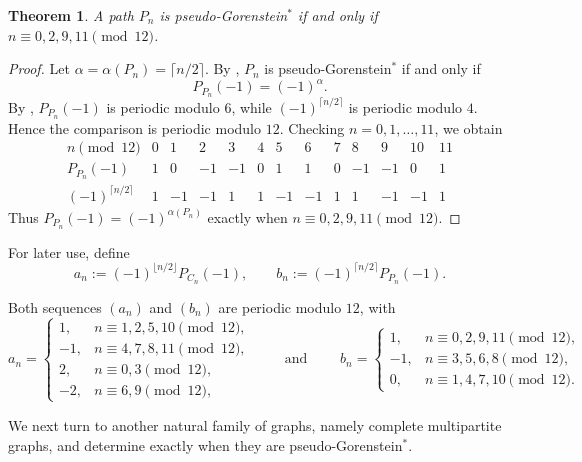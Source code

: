 \documentclass[12pt]{amsart}
\theoremstyle{plain}
\newtheorem{thm}{Theorem}[section]
\theoremstyle{definition}
\begin{document}
\begin{thm}\label{thm:path}
A path \(P_n\) is pseudo-Gorenstein$^{*}$ if and only if \(n\equiv 0,2,9,11 \pmod{12}\).
\end{thm}

\begin{proof}
Let \(\alpha=\alpha(P_n)=\lceil n/2\rceil\). By ,
\(P_n\) is pseudo-Gorenstein$^{*}$ if and only if
\[
P_{P_n}(-1)=(-1)^{\alpha}.
\]
By , \(P_{P_n}(-1)\) is periodic modulo \(6\), while
\((-1)^{\lceil n/2\rceil}\) is periodic modulo \(4\). Hence the comparison is
periodic modulo \(12\). Checking \(n=0,1,\dots,11\), we obtain
\[
\begin{array}{c|cccccccccccc}
n \pmod{12} & 0&1&2&3&4&5&6&7&8&9&10&11\\
\hline
P_{P_n}(-1)
&1&0&-1&-1&0&1&1&0&-1&-1&0&1\\
\hline
(-1)^{\lceil n/2\rceil}
&1&-1&-1&1&1&-1&-1&1&1&-1&-1&1
\end{array}
\]
Thus \(P_{P_n}(-1)=(-1)^{\alpha(P_n)}\) exactly when \(n\equiv 0,2,9,11 \pmod{12}\).
\end{proof}


\begin{notation}
For later use, define
\[
a_n:=(-1)^{\lfloor n/2\rfloor}P_{C_n}(-1),
\qquad
b_n:=(-1)^{\lceil n/2\rceil}P_{P_n}(-1).
\]
\end{notation}

\begin{cor}\label{cor:path-cycle-signed-values}
Both sequences  $(a_n)$ and $(b_n)$ are periodic modulo \(12\), with
\[
a_n=
\begin{cases}
1,& n\equiv 1,2,5,10 \pmod{12},\\[4pt]
-1,& n\equiv 4,7,8,11 \pmod{12},\\[4pt]
2,& n\equiv 0,3 \pmod{12},\\[4pt]
-2,& n\equiv 6,9 \pmod{12},
\end{cases} \qquad \text{ and }\qquad 
b_n=
\begin{cases}
1,& n\equiv 0,2,9,11 \pmod{12},\\[4pt]
-1,& n\equiv 3,5,6,8 \pmod{12},\\[4pt]
0,& n\equiv 1,4,7,10 \pmod{12}.
\end{cases}
\]
\end{cor}


We next turn to another natural family of graphs, namely complete multipartite graphs, and determine exactly when they are pseudo-Gorenstein$^{*}$.
\end{document}
